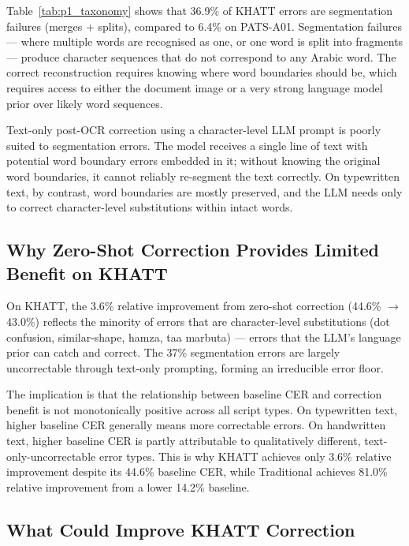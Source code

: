 Table~\ref{tab:p1_taxonomy} shows that 36.9\% of KHATT errors are
segmentation failures (merges + splits), compared to 6.4\% on PATS-A01.
Segmentation failures --- where multiple words are recognised as one, or one
word is split into fragments --- produce character sequences that do not
correspond to any Arabic word. The correct reconstruction requires knowing
where word boundaries should be, which requires access to either the document
image or a very strong language model prior over likely word sequences.

Text-only post-OCR correction using a character-level LLM prompt is poorly
suited to segmentation errors. The model receives a single line of text with
potential word boundary errors embedded in it; without knowing the original
word boundaries, it cannot reliably re-segment the text correctly. On
typewritten text, by contrast, word boundaries are mostly preserved, and the
LLM needs only to correct character-level substitutions within intact words.

\subsection{Why Zero-Shot Correction Provides Limited Benefit on KHATT}
\label{subsec:disc_hw_limited}

On KHATT, the 3.6\% relative improvement from zero-shot correction (44.6\%
$\to$ 43.0\%) reflects the minority of errors that are character-level
substitutions (dot confusion, similar-shape, hamza, taa marbuta) --- errors
that the LLM's language prior can catch and correct. The 37\% segmentation
errors are largely uncorrectable through text-only prompting, forming an
irreducible error floor.

The implication is that the relationship between baseline CER and correction
benefit is not monotonically positive across all script types. On typewritten
text, higher baseline CER generally means more correctable errors. On
handwritten text, higher baseline CER is partly attributable to qualitatively
different, text-only-uncorrectable error types. This is why KHATT achieves
only 3.6\% relative improvement despite its 44.6\% baseline CER, while
Traditional achieves 81.0\% relative improvement from a lower 14.2\% baseline.

\subsection{What Could Improve KHATT Correction}
\label{subsec:disc_hw_what}

